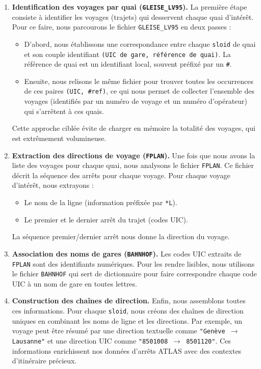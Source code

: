 \begin{enumerate}
    \item \textbf{Identification des voyages par quai (\texttt{GLEISE\_LV95}).}
    La première étape consiste à identifier les voyages (trajets) qui desservent chaque quai d'intérêt. Pour ce faire, nous parcourons le fichier \texttt{GLEISE\_LV95} en deux passes :
    \begin{itemize}
        \item D'abord, nous établissons une correspondance entre chaque \texttt{sloid} de quai et son couple identifiant \texttt{(UIC de gare, référence de quai)}. La référence de quai est un identifiant local, souvent préfixé par un \texttt{\#}.
        \item Ensuite, nous relisons le même fichier pour trouver toutes les occurrences de ces paires \texttt{(UIC, \#ref)}, ce qui nous permet de collecter l'ensemble des voyages (identifiés par un numéro de voyage et un numéro d'opérateur) qui s'arrêtent à ces quais.
    \end{itemize}
    Cette approche ciblée évite de charger en mémoire la totalité des voyages, qui est extrêmement volumineuse.

    \item \textbf{Extraction des directions de voyage (\texttt{FPLAN}).}
    Une fois que nous avons la liste des voyages pour chaque quai, nous analysons le fichier \texttt{FPLAN}. Ce fichier décrit la séquence des arrêts pour chaque voyage. Pour chaque voyage d'intérêt, nous extrayons :
    \begin{itemize}
        \item Le nom de la ligne (information préfixée par \texttt{*L}).
        \item Le premier et le dernier arrêt du trajet (codes UIC).
    \end{itemize}
    La séquence premier/dernier arrêt nous donne la direction du voyage.

    \item \textbf{Association des noms de gares (\texttt{BAHNHOF}).}
    Les codes UIC extraits de \texttt{FPLAN} sont des identifiants numériques. Pour les rendre lisibles, nous utilisons le fichier \texttt{BAHNHOF} qui sert de dictionnaire pour faire correspondre chaque code UIC à un nom de gare en toutes lettres.

    \item \textbf{Construction des chaînes de direction.}
    Enfin, nous assemblons toutes ces informations. Pour chaque \texttt{sloid}, nous créons des chaînes de direction uniques en combinant les noms de ligne et les directions. Par exemple, un voyage peut être résumé par une direction textuelle comme \texttt{"Genève $\rightarrow$ Lausanne"} et une direction UIC comme \texttt{"8501008 $\rightarrow$ 8501120"}. Ces informations enrichissent nos données d'arrêts ATLAS avec des contextes d'itinéraire précieux.
\end{enumerate}




